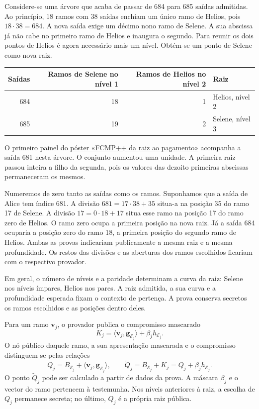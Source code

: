 Considere-se uma árvore que acaba de passar de 684 para 685 saídas
admitidas. Ao princípio, 18 ramos com 38 saídas enchiam um único
ramo de Helios, pois \(18\cdot38=684\). A nova saída exige um
décimo nono ramo de Selene. A sua abscissa já não cabe no primeiro
ramo de Helios e inaugura o segundo. Para reunir os dois pontos de
Helios é agora necessário mais um nível. Obtém-se um ponto de Selene
como nova raiz.
\begin{center}
\begin{tabular}{r r r l}
Saídas & Ramos de Selene no nível 1 & Ramos de Helios no nível 2 & Raiz\\
\hline
684 & 18 & 1 & Helios, nível 2\\
685 & 19 & 2 & Selene, nível 3
\end{tabular}
\end{center}
O primeiro painel do \hyperlink{excerto.fcmp.fim}{póster «FCMP++ da raiz ao pagamento»} acompanha a saída 681 nesta árvore. O conjunto aumentou uma unidade. A primeira raiz passou inteira a
filho da segunda, pois os valores das dezoito primeiras abscissas
permaneceram os mesmos.

Numeremos de zero tanto as saídas como os ramos. Suponhamos que a
saída de Alice tem índice 681. A divisão \(681=17\cdot38+35\)
situa-a na posição 35 do ramo 17 de Selene. A divisão
\(17=0\cdot18+17\) situa esse ramo na posição 17 do ramo zero de
Helios. O ramo zero ocupa a primeira posição na nova raiz. Já a
saída 684 ocuparia a posição zero do ramo 18, a primeira posição
do segundo ramo de Helios. Ambas as provas indicariam publicamente
a mesma raiz e a mesma profundidade. Os restos das divisões e as
aberturas dos ramos escolhidos ficariam com o respectivo provador.

Em geral, o número de níveis e a paridade determinam a curva
da raiz: Selene nos níveis ímpares, Helios nos pares.
A raiz admitida, a sua curva e a profundidade esperada fixam
o contexto de pertença. A prova conserva secretos os ramos
escolhidos e as posições dentro deles.


Para um ramo \(\boldsymbol v_j\), o provador publica o
compromisso mascarado
\[
 K_j=\langle\boldsymbol v_j,\boldsymbol g_{\mathcal E_j}\rangle
                +\beta_jh_{\mathcal E_j}.
\]
O nó público daquele ramo, a sua apresentação mascarada e
o compromisso distinguem-se pelas relações
\begin{equation}
 Q_j=B_{\mathcal E_j}
         +\langle\boldsymbol v_j,\boldsymbol g_{\mathcal E_j}\rangle,
 \qquad
 \widetilde Q_j=B_{\mathcal E_j}+K_j
               =Q_j+\beta_jh_{\mathcal E_j}.
 \label{eq:fcmp-branch-masking}
\end{equation}
O ponto \(\widetilde Q_j\) pode ser calculado a partir de
dados da prova. A máscara \(\beta_j\) e o vector do ramo
pertencem à testemunha. Nos níveis anteriores à raiz,
a escolha de \(Q_j\) permanece secreta; no último,
\(Q_j\) é a própria raiz pública.

